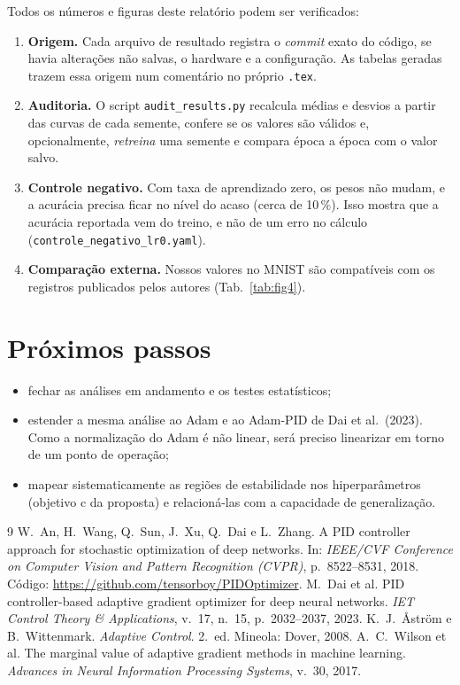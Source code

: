 \documentclass[11pt,a4paper]{article}
\begin{document}
Todos os números e figuras deste relatório podem ser verificados:
\begin{enumerate}
  \item \textbf{Origem.} Cada arquivo de resultado registra o \emph{commit} exato do
        código, se havia alterações não salvas, o hardware e a configuração. As
        tabelas geradas trazem essa origem num comentário no próprio \texttt{.tex}.
  \item \textbf{Auditoria.} O script \texttt{audit\_results.py} recalcula médias e
        desvios a partir das curvas de cada semente, confere se os valores são
        válidos e, opcionalmente, \emph{retreina} uma semente e compara época a época
        com o valor salvo.
  \item \textbf{Controle negativo.} Com taxa de aprendizado zero, os pesos não mudam,
        e a acurácia precisa ficar no nível do acaso (cerca de 10\,\%). Isso mostra que a
        acurácia reportada vem do treino, e não de um erro no cálculo
        (\texttt{controle\_negativo\_lr0.yaml}).
  \item \textbf{Comparação externa.} Nossos valores no MNIST são compatíveis com os
        registros publicados pelos autores (Tab.~\ref{tab:fig4}).
\end{enumerate}

\section{Próximos passos}

\begin{itemize}
  \item fechar as análises em andamento e os testes estatísticos;
  \item estender a mesma análise ao Adam e ao Adam-PID de Dai et al.\ (2023). Como a
        normalização do Adam é não linear, será preciso linearizar em torno de um
        ponto de operação;
  \item mapear sistematicamente as regiões de estabilidade nos hiperparâmetros
        (objetivo c da proposta) e relacioná-las com a capacidade de generalização.
\end{itemize}

\begin{thebibliography}{9}
 W.~An, H.~Wang, Q.~Sun, J.~Xu, Q.~Dai e L.~Zhang.
  A PID controller approach for stochastic optimization of deep networks.
  In: \emph{IEEE/CVF Conference on Computer Vision and Pattern Recognition (CVPR)},
  p.~8522--8531, 2018. Código: \url{https://github.com/tensorboy/PIDOptimizer}.
 M.~Dai et al.
  PID controller-based adaptive gradient optimizer for deep neural networks.
  \emph{IET Control Theory \& Applications}, v.~17, n.~15, p.~2032--2037, 2023.
 K.~J.~Åström e B.~Wittenmark.
  \emph{Adaptive Control}. 2.\ ed. Mineola: Dover, 2008.
 A.~C.~Wilson et al.
  The marginal value of adaptive gradient methods in machine learning.
  \emph{Advances in Neural Information Processing Systems}, v.~30, 2017.
\end{thebibliography}
\end{document}
